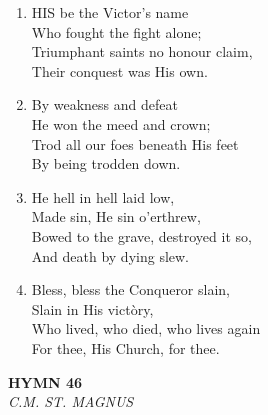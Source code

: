 \documentclass[11pt,a4paper]{article}
\begin{document}
\begin{enumerate}
    \item HIS be the Victor's name \\
        Who fought the fight alone; \\
        Triumphant saints no honour claim, \\
        Their conquest was His own.

    \item By weakness and defeat \\
        He won the meed and crown; \\
        Trod all our foes beneath His feet \\
        By being trodden down.

    \item He hell in hell laid low, \\
        Made sin, He sin o'erthrew, \\
        Bowed to the grave, destroyed it so, \\
        And death by dying slew.

    \item Bless, bless the Conqueror slain, \\
        Slain in His vict\`ory, \\
        Who lived, who died, who lives again \\
        For thee, His Church, for thee.

\end{enumerate}

\newpage
\begin{center}
    {\Large \textbf{HYMN 46}}
    \\
    \textit{C.M. ST. MAGNUS}
\end{center}
\vspace{1em}
\end{document}
